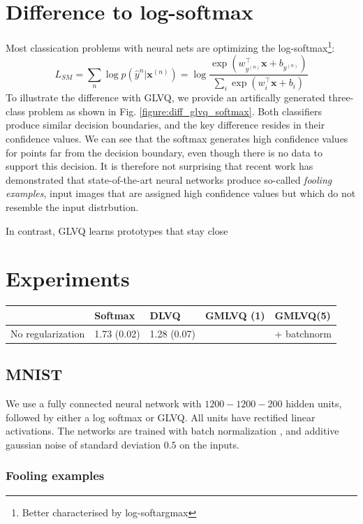 \documentclass{esannV2}
\begin{document}
\section{Difference to log-softmax}
Most classication problems with neural nets are optimizing the log-softmax\footnote{Better characterised by log-softargmax}:
\begin{equation}
L_{SM} = \sum_n \log p(\hat{y}^{n}| \mathbf{x}^{(n)}) = \log \frac{\exp(w_{y^{(n)}}^\top \mathbf{x} + b_{y^{(n)}})}{\sum_i \exp(w_i^\top \mathbf{x} + b_i)}
\end{equation}
To illustrate the difference with GLVQ, we provide an artifically generated three-class problem as shown in Fig. \ref{figure:diff_glvq_softmax}. Both classifiers produce similar decision boundaries, and the key difference resides in their confidence values. We can see that the softmax generates high confidence values for points far from the decision boundary, even though there is no data to support this decision. It is therefore not surprising that recent work has demonstrated that state-of-the-art neural networks produce so-called \emph{fooling examples}\cite{DBLP:journals/corr/NguyenYC14}, input images that are assigned high confidence values but which do not resemble the input distrbution.  

In contrast, GLVQ learns prototypes that stay close 

\section{Experiments}
\begin{table}
 \begin{tabular}{l|llll}
  & Softmax & DLVQ & GMLVQ (1) & GMLVQ(5)\\
 \hline
 No regularization & 1.73 (0.02) & 1.28 (0.07) &  &
 + batchnorm &   
 \end{tabular}
\end{table}

\subsection{MNIST}
We use a fully connected neural network with $1200-1200-200$ hidden units, followed by either a log softmax or GLVQ. All units have rectified linear activations. The networks are trained with batch normalization \cite{DBLP:journals/corr/IoffeS15}, and additive gaussian noise of standard deviation $0.5$ on the inputs. 

\subsubsection{Fooling examples}
\end{document}
